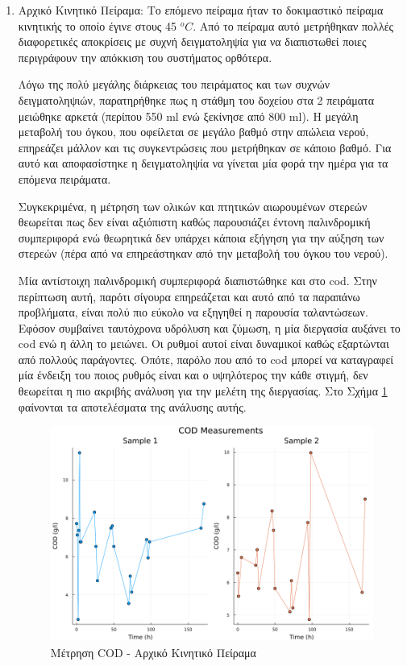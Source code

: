 \documentclass[11pt]{report}
\begin{document}
\begin{enumerate}
\item Αρχικό Κινητικό Πείραμα:
\label{sec:org66b0087}
Το επόμενο πείραμα ήταν το δοκιμαστικό πείραμα κινητικής το οποίο έγινε στους 45 \(^oC\). Από το πείραμα αυτό μετρήθηκαν πολλές διαφορετικές αποκρίσεις με συχνή δειγματοληψία για να διαπιστωθεί ποιες περιγράφουν την απόκκιση του συστήματος ορθότερα.

Λόγω της πολύ μεγάλης διάρκειας του πειράματος και των συχνών δειγματοληψιών, παρατηρήθηκε πως η στάθμη του δοχείου στα 2 πειράματα μειώθηκε αρκετά (περίπου 550 ml ενώ ξεκίνησε από 800 ml). Η μεγάλη μεταβολή του όγκου, που οφείλεται σε μεγάλο βαθμό στην απώλεια νερού, επηρεάζει μάλλον και τις συγκεντρώσεις που μετρήθηκαν σε κάποιο βαθμό. Για αυτό και αποφασίστηκε η δειγματοληψία να γίνεται μία φορά την ημέρα για τα επόμενα πειράματα.

Συγκεκριμένα, η μέτρηση των ολικών και πτητικών αιωρουμένων στερεών θεωρείται πως δεν είναι αξιόπιστη καθώς παρουσιάζει έντονη παλινδρομική συμπεριφορά ενώ θεωρητικά δεν υπάρχει κάποια εξήγηση για την αύξηση των στερεών (πέρα από να επηρεάστηκαν από την μεταβολή του όγκου του νερού).

Μία αντίστοιχη παλινδρομική συμπεριφορά διαπιστώθηκε και στο \acrshort{cod}. Στην περίπτωση αυτή, παρότι σίγουρα επηρεάζεται και αυτό από τα παραπάνω προβλήματα, είναι πολύ πιο εύκολο να εξηγηθεί η παρουσία ταλαντώσεων. Εφόσον συμβαίνει ταυτόχρονα υδρόλυση και ζύμωση, η μία διεργασία αυξάνει το \acrshort{cod} ενώ η άλλη το μειώνει. Οι ρυθμοί αυτοί είναι δυναμικοί καθώς εξαρτώνται από πολλούς παράγοντες. Οπότε, παρόλο που από το \acrshort{cod} μπορεί να καταγραφεί μία ένδειξη του ποιος ρυθμός είναι και ο υψηλότερος την κάθε στιγμή, δεν θεωρείται η πιο ακριβής ανάλυση για την μελέτη της διεργασίας. Στο Σχήμα \ref{fig:orgdac591d} φαίνονται τα αποτελέσματα της ανάλυσης αυτής.

\begin{figure}[htbp]
\centering
\includegraphics[width=.9\linewidth]{../plots/23_10/cod_scatter_23_10.png}
\caption{\label{fig:orgdac591d}Μέτρηση COD - Αρχικό Κινητικό Πείραμα}
\end{figure}


\end{enumerate}
\end{document}
